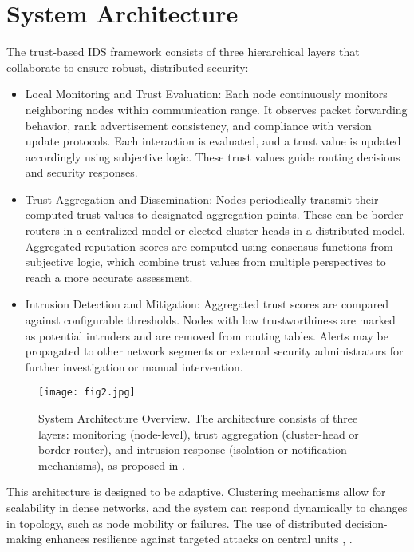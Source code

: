\documentclass[final,5p,times,twocolumn]{elsarticle}
\begin{document}
\section{System Architecture}
The trust-based IDS framework consists of three hierarchical layers that collaborate to ensure robust, distributed security:
\begin{itemize}
  \item Local Monitoring and Trust Evaluation: Each node continuously monitors neighboring nodes within communication range. It observes packet forwarding behavior, rank advertisement consistency, and compliance with version update protocols. Each interaction is evaluated, and a trust value is updated accordingly using subjective logic. These trust values guide routing decisions and security responses.
  \item Trust Aggregation and Dissemination: Nodes periodically transmit their computed trust values to designated aggregation points. These can be border routers in a centralized model or elected cluster-heads in a distributed model. Aggregated reputation scores are computed using consensus functions from subjective logic, which combine trust values from multiple perspectives to reach a more accurate assessment.
  \item Intrusion Detection and Mitigation: Aggregated trust scores are compared against configurable thresholds. Nodes with low trustworthiness are marked as potential intruders and are removed from routing tables. Alerts may be propagated to other network segments or external security administrators for further investigation or manual intervention.
\end{itemize}

\begin{figure}[htbp]
    \centering
    \texttt{[image: fig2.jpg]} 
    \caption{System Architecture Overview. The architecture consists of three layers: monitoring (node-level), trust aggregation (cluster-head or border router), and intrusion response (isolation or notification mechanisms), as proposed in \cite{Khan2017}.}
    \label{fig:system_architecture}
\end{figure}

This architecture is designed to be adaptive. Clustering mechanisms allow for scalability in dense networks, and the system can respond dynamically to changes in topology, such as node mobility or failures. The use of distributed decision-making enhances resilience against targeted attacks on central units \cite{Khan2017}, \cite{Ioulianou2022}.
\end{document}
